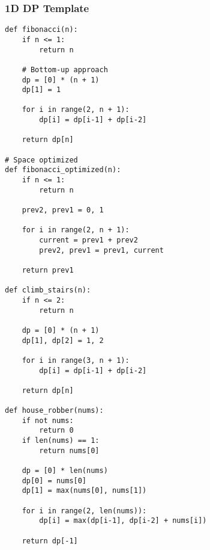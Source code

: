 \documentclass[10pt,a4paper]{article}
\begin{document}
\subsubsection{1D DP Template}
\begin{lstlisting}
def fibonacci(n):
    if n <= 1:
        return n

    # Bottom-up approach
    dp = [0] * (n + 1)
    dp[1] = 1

    for i in range(2, n + 1):
        dp[i] = dp[i-1] + dp[i-2]

    return dp[n]

# Space optimized
def fibonacci_optimized(n):
    if n <= 1:
        return n

    prev2, prev1 = 0, 1

    for i in range(2, n + 1):
        current = prev1 + prev2
        prev2, prev1 = prev1, current

    return prev1

def climb_stairs(n):
    if n <= 2:
        return n

    dp = [0] * (n + 1)
    dp[1], dp[2] = 1, 2

    for i in range(3, n + 1):
        dp[i] = dp[i-1] + dp[i-2]

    return dp[n]

def house_robber(nums):
    if not nums:
        return 0
    if len(nums) == 1:
        return nums[0]

    dp = [0] * len(nums)
    dp[0] = nums[0]
    dp[1] = max(nums[0], nums[1])

    for i in range(2, len(nums)):
        dp[i] = max(dp[i-1], dp[i-2] + nums[i])

    return dp[-1]
\end{lstlisting}
\end{document}
